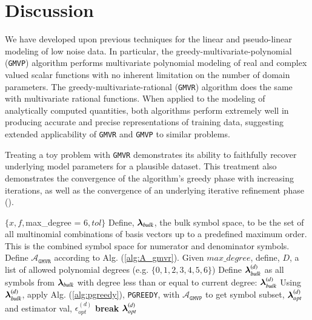\documentclass[twocolumn,aps,prd,floatfix,preprintnumbers,a4paper,nofootinbib,
superscriptaddress,10pt]{revtex4-1}
\def\gmvp#1{greedy-multivariate-polynomial#1
  (\texttt{GMVP}#1)\gdef\gmvp{\texttt{GMVP}}}
\def\gmvr#1{greedy-multivariate-rational#1
  (\texttt{GMVR}#1)\gdef\gmvr{\texttt{GMVR}}}
\def\pgreedy{\texttt{PGREEDY}}
\begin{document}
\section{Discussion}
\label{discuss}
%
\par We have developed upon previous techniques for the linear and pseudo-linear modeling of low noise data.
%
In particular, the \gmvp{} algorithm performs multivariate polynomial modeling of real and complex valued scalar functions with no inherent limitation on the number of domain parameters.
%
The \gmvr{} algorithm does the same with multivariate rational functions.
%
When applied to the modeling of analytically computed quantities, both algorithms perform extremely well in producing accurate and precise representations of training data, suggesting extended applicability of \gmvr{} and \gmvp{} to similar problems.
%
\par Treating a toy problem with \gmvr{} demonstrates its ability to faithfully recover underlying model parameters for a plausible dataset.
%
This treatment also demonstrates the convergence of the algorithm's greedy phase with increasing iterations, as well as the convergence of an underlying iterative refinement phase ().
%
%
%
{\scriptsize
\begin{algorithm}[H]
  \caption{\gmvr{}, a degree tempered stepwise algorithm for multivariate rational modeling of scalar data.}
  \label{alg:gmvr}
  \begin{algorithmic}[1]
     $ \{ x, f, $max\_degree = 6$, tol \}$
    \vskip 10pt
    \State Define, ${\bm{\lambda}}_{bulk}$, the bulk symbol space, to be the set of all multinomial combinations of basis vectors up to a predefined maximum order. This is the combined symbol space for numerator and denominator symbols.
    \State Define $\mathcal{A}_{\gmvr{}}$ according to Alg. (\ref{alg:A_gmvr}).
    \State Given $max\_degree$, define, ${ D}$, a list of allowed polynomial degrees (e.g. $\{0,1,2,3,4,5,6\}$)
      \State Define ${\bm{\lambda}}_{bulk}^{(d)}$ as all symbols from ${\bm{\lambda}}_{bulk}$ with degree less than or equal to current degree: ${\bm{\lambda}}^{(d)}_{bulk}$
      \State Using ${\bm{\lambda}}_{bulk}^{(d)}$, apply Alg. (\ref{alg:pgreedy}), \pgreedy{}, with $\mathcal{A}_{\gmvp{}}$ to get symbol subset, ${\bm{\lambda}}^{(d)}_{opt}$ and estimator val, $\epsilon^{(d)}_{opt}$
        \State \textbf{break}
      \EndIf
    \EndFor
    \vskip 10pt
     ${\bm{\lambda}}^{(d)}_{opt}$
  \end{algorithmic}
\end{algorithm}
}
\end{document}
